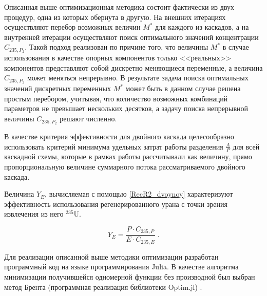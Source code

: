 
Описанная выше оптимизационная методика состоит фактически из двух процедур, одна из которых обернута в другую. На внешних итерациях осуществляют перебор возможных величин $M^{*}$ для каждого из каскадов, а на внутренней итерации осуществляют поиск оптимального значений концентрации $C_{235,{P_2}}$. Такой подход реализован по причине того, что величины $M^{*}$ в случае использования в качестве опорных компонентов только <<реальных>> компонентов представляют собой дискретно меняющиеся переменные, а величина $C_{235,{P_2}}$ может меняться непрерывно. В результате задача поиска оптимальных значений дискретных переменных $M^{*}$ может быть в данном случае решена простым перебором, учитывая, что количество возможных комбинаций параметров не превышает нескольких десятков, а задачу поиска непрерывной величины $C_{235,{P_2}}$ решают численно.

В качестве критерия эффективности для двойного каскада целесообразно использовать критерий минимума удельных затрат работы разделения $\frac{A}{P}$ для всей каскадной схемы, которые в рамках работы рассчитывали как величину, прямо пропорциональную величине суммарного потока рассматриваемого двойного каскада.

Величина $Y_{E}$, вычисляемая с помощью \ref{RecR2_dvoynoy} характеризуют эффективность использования регенерированного урана с точки зрения извлечения из него $^{235}$U.

\begin{equation} \label{RecR2_dvoynoy} 
    Y_{E} = \frac{P\cdot C_{235,P}}{E \cdot C_{235,E}}  \; .    
\end{equation} 

Для реализации описанной выше методики оптимизации разработан программный код на языке программирования Julia. В качестве алгоритма минимизации получившейся одномерной функции без производной был выбран метод Брента (программная реализация библиотеки Optim.jl) \cite{Brent_algorithm,mosk_lec,Optim.jl-2018}.

